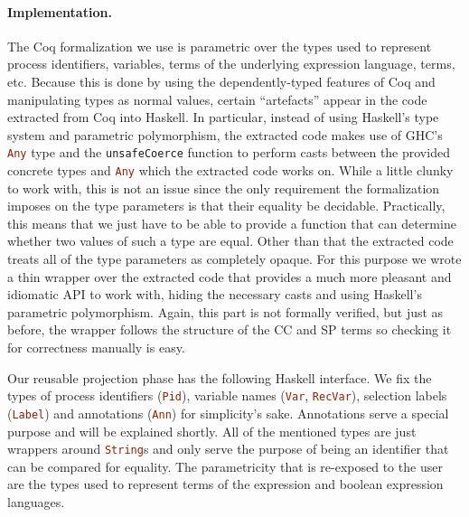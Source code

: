 \documentclass[runningheads]{llncs}
\newcommand{\hc}{\lstinline[language=Haskell,style=solarized-light]}
\begin{document}
\paragraph*{Implementation.}

The Coq formalization we use is parametric over the types used to represent process identifiers, variables, terms of the underlying expression language, terms, etc.
Because this is done by using the dependently-typed features of Coq and manipulating types as normal values, certain ``artefacts'' appear in the code extracted from Coq into Haskell.
In particular, instead of using Haskell's type system and parametric polymorphism, the extracted code makes use of GHC's  \hc{Any} type and the \hc{unsafeCoerce} function to perform casts between the provided concrete types and \hc{Any} which the extracted code works on.
While a little clunky to work with, this is not an issue since the only requirement the formalization imposes on the type parameters is that their equality be decidable.
Practically, this means that we just have to be able to provide a function that can determine whether two values of such a type are equal.
Other than that the extracted code treats all of the type parameters as completely opaque.
For this purpose we wrote a thin wrapper over the extracted code that provides a much more pleasant and idiomatic API to work with, hiding the necessary casts and using Haskell's parametric polymorphism.
Again, this part is not formally verified, but just as before, the wrapper follows the structure of the CC and SP terms so checking it for correctness manually is easy.

Our reusable projection phase has the following Haskell interface.
We fix the types of process identifiers (\hc{Pid}), variable names (\hc{Var}, \hc{RecVar}), selection labels (\hc{Label}) and annotations (\hc{Ann}) for simplicity's sake.
Annotations serve a special purpose and will be explained shortly.
All of the mentioned types are just wrappers around \hc{String}s and only serve the purpose of being an identifier that can be compared for equality.
The parametricity that is re-exposed to the user are the types used to represent terms of the expression and boolean expression languages.
\end{document}
